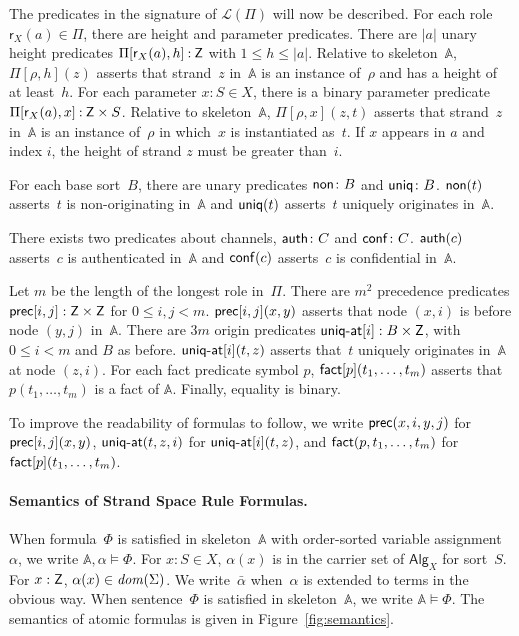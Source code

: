 \documentclass[12pt]{article}
\newcommand{\sdom}{\fn{dom}}
\newcommand{\typ}{\mathbin:}
\newcommand{\lang}{\mathcal{L}}
\newcommand{\skel}{\mathbb{A}}
\newcommand{\length}[1]{\ensuremath{|#1|}}
\newcommand{\role}{\mathsf{r}}
\renewcommand{\alg}[1]{\ensuremath{\mathsf{#1}}}
\newcommand{\msg}{\alg{Alg}}
\newcommand{\ssp}{\Sigma}
\begin{document}
The predicates in the signature of $\lang(\Pi)$ will now be described.
For each role $\role_X(a)\in\Pi$, there are height and parameter
predicates.  There are $\length{a}$ unary height predicates
$\Pi[\role_X(a),h]\typ\srt{Z}$ with $1\leq h \leq\length{a}$.
Relative to skeleton~$\skel$, $\Pi[\rho,h](z)$ asserts that strand~$z$
in~$\skel$ is an instance of~$\rho$ and has a height of at least~$h$.
For each parameter $x\typ S\in X$, there is a binary parameter
predicate $\Pi[\role_X(a),x]\typ\srt{Z}\times S$.  Relative to
skeleton~$\skel$, $\Pi[\rho,x](z,t)$ asserts that strand~$z$
in~$\skel$ is an instance of~$\rho$ in which~$x$ is instantiated
as~$t$.  If $x$ appears in $a$ and index $i$, the height of strand $z$
must be greater than~$i$.

For each base sort~$B$, there are unary predicates $\operatorname{\mathsf{non}}\colon B$
and $\operatorname{\mathsf{uniq}}\colon B$.  $\operatorname{\mathsf{non}}(t)$ asserts~$t$ is non-originating
in~$\skel$ and $\operatorname{\mathsf{uniq}}(t)$ asserts~$t$ uniquely originates
in~$\skel$.

There exists two predicates about channels, $\operatorname{\mathsf{auth}}\colon C$ and
$\operatorname{\mathsf{conf}}\colon C$.  $\operatorname{\mathsf{auth}}(c)$ asserts~$c$ is authenticated
in~$\skel$ and $\operatorname{\mathsf{conf}}(c)$ asserts~$c$ is confidential in~$\skel$.

Let $m$ be the length of the longest role in~$\Pi$.  There are $m^2$
precedence predicates $\operatorname{\mathsf{prec}}[i,j]:\mathsf{Z}\times\mathsf{Z}$ for $0\leq
i,j< m$.  $\operatorname{\mathsf{prec}}[i,j](x,y)$ asserts that node $(x,i)$ is before
node $(y,j)$ in~$\skel$.  There are $3m$ origin predicates
$\operatorname{\mathsf{uniq-at}}[i]:B\times\mathsf{Z}$, with $0\leq i< m$ and $B$ as before.
$\operatorname{\mathsf{uniq-at}}[i](t,z)$ asserts that~$t$ uniquely originates in~$\skel$
at node $(z,i)$.  For each fact predicate symbol $p$,
$\operatorname{\mathsf{fact}}[p](t_1,\ldots,t_m)$ asserts that $p(t_1,\ldots,t_m)$ is a
fact of $\skel$.  Finally, equality is binary.

To improve the readability of formulas to follow, we write
$\operatorname{\mathsf{prec}}(x,i,y,j)$ for $\operatorname{\mathsf{prec}}[i,j](x,y)$, $\operatorname{\mathsf{uniq-at}}(t,z,i)$
for $\operatorname{\mathsf{uniq-at}}[i](t,z)$, and $\operatorname{\mathsf{fact}}(p,t_1,\ldots,t_m)$ for
$\operatorname{\mathsf{fact}}[p](t_1,\ldots,t_m)$.

\paragraph{Semantics of Strand Space Rule Formulas.}

When formula~$\Phi$ is satisfied in skeleton~$\skel$ with order-sorted
variable assignment $\alpha$, we write $\skel,\alpha\models\Phi$.  For
$x:S\in X$, $\alpha(x)$ is in the carrier set of $\msg_X$ for
sort~$S$.  For $x:\mathsf{Z}$, $\alpha(x)\in\sdom(\ssp)$.  We
write~$\bar\alpha$ when~$\alpha$ is extended to terms in the obvious
way.  When sentence~$\Phi$ is satisfied in skeleton~$\skel$, we write
$\skel\models\Phi$.  The semantics of atomic formulas is given in
Figure~\ref{fig:semantics}.
\end{document}
